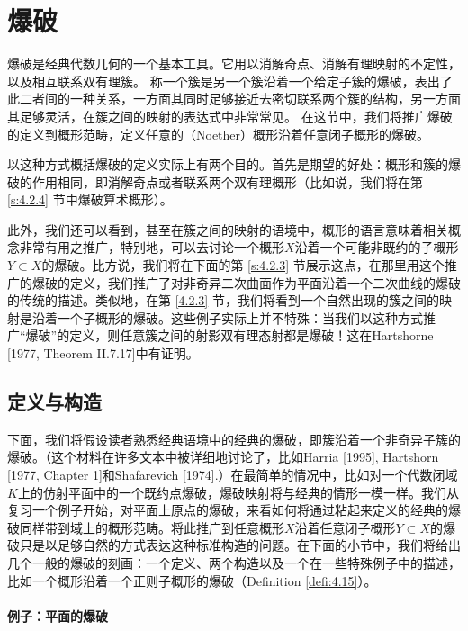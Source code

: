 \section{爆破}\label{s:4.2}

爆破是经典代数几何的一个基本工具。它用以消解奇点、消解有理映射的不定性，以及相互联系双有理簇。
称一个簇是另一个簇沿着一个给定子簇的爆破，表出了此二者间的一种关系，一方面其同时足够接近去密切联系两个簇的结构，另一方面其足够灵活，在簇之间的映射的表达式中非常常见。
在这节中，我们将推广爆破的定义到概形范畴，定义任意的（Noether）概形沿着任意闭子概形的爆破。

以这种方式概括爆破的定义实际上有两个目的。首先是期望的好处：概形和簇的爆破的作用相同，即消解奇点或者联系两个双有理概形（比如说，我们将在第 \ref{s:4.2.4} 节中爆破算术概形）。

此外，我们还可以看到，甚至在簇之间的映射的语境中，概形的语言意味着相关概念非常有用之推广，特别地，可以去讨论一个概形$X$沿着一个可能非既约的子概形$Y\subset X$的爆破。比方说，我们将在下面的第 \ref{s:4.2.3} 节展示这点，在那里用这个推广的爆破的定义，我们推广了对非奇异二次曲面作为平面沿着一个二次曲线的爆破的传统的描述。类似地，在第 \ref{4.2.3} 节，我们将看到一个自然出现的簇之间的映射是沿着一个子概形的爆破。这些例子实际上并不特殊：当我们以这种方式推广“爆破”的定义，则任意簇之间的射影双有理态射都是爆破！这在Hartshorne [1977, Theorem II.7.17]中有证明。

\subsection{定义与构造}\label{s:4.2.1}


下面，我们将假设读者熟悉经典语境中的经典的爆破，即簇沿着一个非奇异子簇的爆破。（这个材料在许多文本中被详细地讨论了，比如Harria [1995], Hartshorn [1977, Chapter 1]和Shafarevich [1974].）在最简单的情况中，比如对一个代数闭域$K$上的仿射平面中的一个既约点爆破，爆破映射将与经典的情形一模一样。我们从复习一个例子开始，对平面上原点的爆破，来看如何将通过粘起来定义的经典的爆破同样带到域上的概形范畴。将此推广到任意概形$X$沿着任意闭子概形$Y\subset X$的爆破只是以足够自然的方式表达这种标准构造的问题。在下面的小节中，我们将给出几个一般的爆破的刻画：一个定义、两个构造以及一个在一些特殊例子中的描述，比如一个概形沿着一个正则子概形的爆破（Definition \ref{defi:4.15}）。

\paragraph*{例子：平面的爆破}


